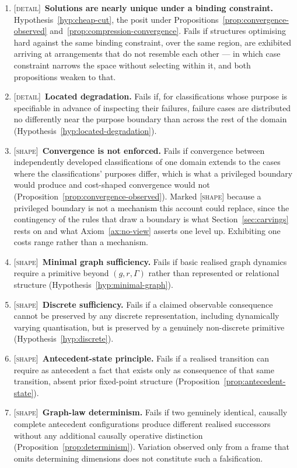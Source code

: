 \documentclass[11pt,a4paper]{article}
\theoremstyle{remark}\newtheorem{remark}[definition]{Remark}
\begin{document}
\begin{enumerate}[leftmargin=*]
\item \textsc{[detail]}~\textbf{Solutions are nearly unique under a binding constraint.} Hypothesis~\ref{hyp:cheap-cut}, the posit under Propositions~\ref{prop:convergence-observed} and~\ref{prop:compression-convergence}. Fails if structures optimising hard against the same binding constraint, over the same region, are exhibited arriving at arrangements that do not resemble each other --- in which case constraint narrows the space without selecting within it, and both propositions weaken to that.
\item \textsc{[detail]}~\textbf{Located degradation.} Fails if, for classifications whose purpose is specifiable in advance of inspecting their failures, failure cases are distributed no differently near the purpose boundary than across the rest of the domain (Hypothesis~\ref{hyp:located-degradation}).
\item \textsc{[shape]}~\textbf{Convergence is not enforced.} Fails if convergence between independently developed classifications of one domain extends to the cases where the classifications' purposes differ, which is what a privileged boundary would produce and cost-shaped convergence would not (Proposition~\ref{prop:convergence-observed}). Marked \textsc{[shape]} because a privileged boundary is not a mechanism this account could replace, since the contingency of the rules that draw a boundary is what Section~\ref{sec:carvings} rests on and what Axiom~\ref{ax:no-view} asserts one level up. Exhibiting one costs range rather than a mechanism.
\item \textsc{[shape]}~\textbf{Minimal graph sufficiency.} Fails if basic realised graph dynamics require a primitive beyond $(g,r,\Gamma)$ rather than represented or relational structure (Hypothesis~\ref{hyp:minimal-graph}).
\item \textsc{[shape]}~\textbf{Discrete sufficiency.} Fails if a claimed observable consequence cannot be preserved by any discrete representation, including dynamically varying quantisation, but is preserved by a genuinely non-discrete primitive (Hypothesis~\ref{hyp:discrete}).
\item \textsc{[shape]}~\textbf{Antecedent-state principle.} Fails if a realised transition can require as antecedent a fact that exists only as consequence of that same transition, absent prior fixed-point structure (Proposition~\ref{prop:antecedent-state}).
\item \textsc{[shape]}~\textbf{Graph-law determinism.} Fails if two genuinely identical, causally complete antecedent configurations produce different realised successors without any additional causally operative distinction (Proposition~\ref{prop:determinism}). Variation observed only from a frame that omits determining dimensions does not constitute such a falsification.

\end{enumerate}
\end{document}
